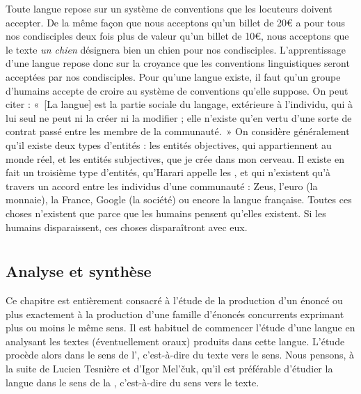 {     Toute langue repose sur un système de conventions que les locuteurs doivent accepter. De la même façon que nous acceptons qu’un billet de 20€ a pour tous nos condisciples deux fois plus de valeur qu’un billet de 10€, nous acceptons que le texte \textit{un chien} désignera bien un chien pour nos condisciples. L’apprentissage d’une langue repose donc sur la croyance que les conventions linguistiques seront acceptées par nos condisciples. Pour qu’une langue existe, il faut qu’un groupe d’humains accepte de croire au système de conventions qu’elle suppose. On peut citer \citet[31]{Saussure1916} : «~[La langue] est la partie sociale du langage, extérieure à l’individu, qui à lui seul ne peut ni la créer ni la modifier ; elle n’existe qu’en vertu d’une sorte de contrat passé entre les membre de la communauté.~» On considère généralement qu’il existe deux types d’entités : les entités objectives, qui appartiennent au monde réel, et les entités subjectives, que je crée dans mon cerveau. Il existe en fait un troisième type d’entités, qu’Harari appelle les , et qui n’existent qu’à travers un accord entre les individus d’une communauté : Zeus, l’euro (la monnaie), la France, Google (la société) ou encore la langue française. Toutes ces choses n’existent que parce que les humains pensent qu’elles existent. Si les humains disparaissent, ces choses disparaîtront avec eux.
}

\chapter{}\label{sec:1.2}

\section{Analyse et synthèse}\label{sec:1.2.0}

Ce chapitre est entièrement consacré à l’étude de la production d’un énoncé ou plus exactement à la production d’une famille d’énoncés concurrents exprimant plus ou moins le même sens. Il est habituel de commencer l’étude d’une langue en analysant les textes (éventuellement oraux) produits dans cette langue. L’étude procède alors dans le sens de l’, c’est-à-dire du texte vers le sens. Nous pensons, à la suite de Lucien Tesnière et d’Igor Mel’čuk, qu’il est préférable d’étudier la langue dans le sens de la , c’est-à-dire du sens vers le texte.

